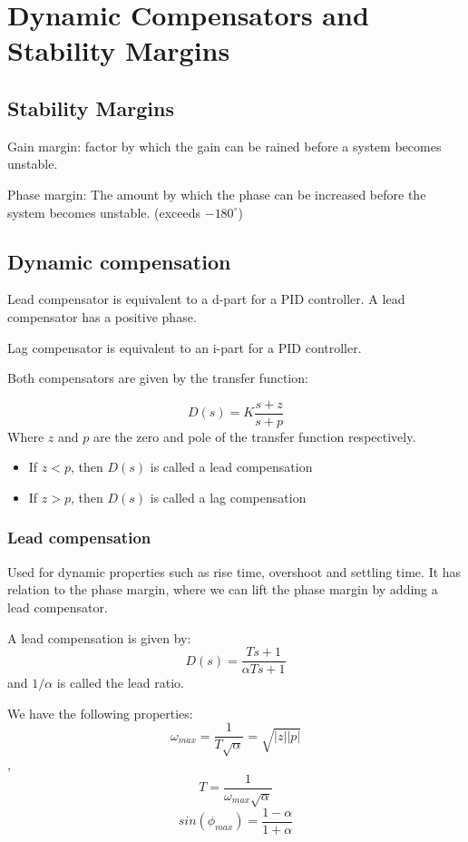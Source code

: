 \section{Dynamic Compensators and Stability Margins}

\subsection{Stability Margins}

Gain margin: factor by which the gain can be rained before a system becomes unstable.

Phase margin: The amount by which the phase can be increased before the system becomes unstable. (exceeds $-180 ^\circ$)




\subsection{Dynamic compensation}

Lead compensator is equivalent to a d-part for a PID controller.
A lead compensator has a positive phase.

Lag compensator is equivalent to an i-part for a PID controller.

Both compensators are given by the transfer function:

$$ D(s) = K \frac{s + z}{s + p} $$
Where $z$ and $p$ are the zero and pole of the transfer function respectively.

\begin{itemize}
	\item {If $z<p$, then $D(s)$ is called a lead compensation}
	      \item{If $z>p$, then $D(s)$ is called a lag compensation}
\end{itemize}

\subsubsection{Lead compensation}

Used for dynamic properties such as rise time, overshoot and settling time. It has relation
to the phase margin, where we can lift the phase margin by adding a lead compensator.

A lead compensation is given by:
$$D(s) = \frac{Ts+1}{\alpha Ts+1}$$
and $1/\alpha$ is called the lead ratio.

We have the following properties:
$$\omega_{max} = \frac{1}{T\sqrt{\alpha}} = \sqrt{|z||p|}$$,
$$T = \frac{1}{\omega_{max}\sqrt{\alpha}}$$
$$sin(\phi_{max}) = \frac{1-\alpha}{1+\alpha}$$

